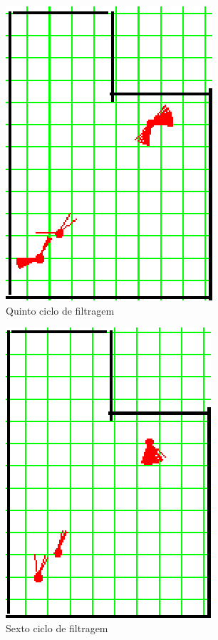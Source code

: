 \begin{figure}[H]
  \centering
  \includegraphics[scale=1]{figuras/cen2_ex1/6.eps}
  \caption[Quinto Ciclo de Filtragem]{Quinto ciclo de filtragem}
  \label{img:cen2_ex1_6}
\end{figure}

\begin{figure}[H]
  \centering
  \includegraphics[scale=1]{figuras/cen2_ex1/7.eps}
  \caption[Sexto Ciclo de Filtragem]{Sexto ciclo de filtragem}
  \label{img:cen2_ex1_7}
\end{figure}

